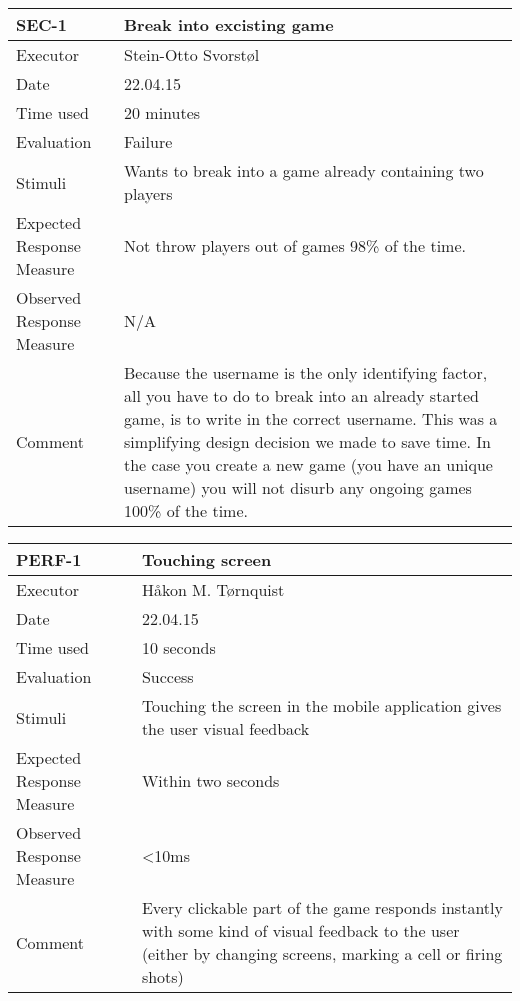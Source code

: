 \begin{table}[H]
\begin{tabular}{|l|p{10cm}|}
\hline
\textbf{SEC-1} & Break into excisting game \\ \hline
Executor    & Stein-Otto Svorstøl         \\ \hline
Date        & 22.04.15         \\ \hline
Time used   & 20 minutes        \\ \hline
Evaluation  & Failure           \\ \hline
Stimuli     &  Wants to break into a game already containing two players           \\ \hline
Expected Response Measure & Not throw players out of games 98\% of the time.    \\ \hline
Observed Response Measure & N/A       \\ \hline
Comment     &  Because the username is the only identifying factor, all you have to do to break into an already started game, is to write in the correct username. This was a simplifying design decision we made to save time. In the case you create a new game (you have an unique username) you will not disurb any ongoing games 100\% of the time.    \\ \hline

\end{tabular}
\end{table}

\begin{table}[H]
\begin{tabular}{|l|p{10cm}|}
\hline
\textbf{PERF-1} & Touching screen \\ \hline
Executor    & Håkon M. Tørnquist            \\ \hline
Date        & 22.04.15         \\ \hline
Time used   & 10 seconds          \\ \hline
Evaluation  & Success            \\ \hline
Stimuli     & Touching the screen in the mobile application gives the user visual feedback       \\ \hline
Expected Response Measure & Within two seconds        \\ \hline
Observed Response Measure & <10ms        \\ \hline
Comment     & Every clickable part of the game responds instantly with some kind of visual feedback to the user (either by changing screens, marking a cell or firing shots)   \\ \hline
\end{tabular}
\end{table}

